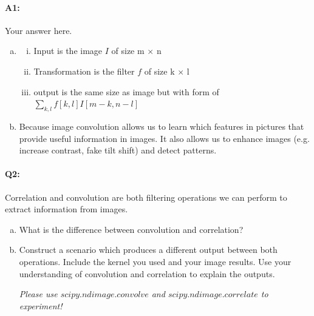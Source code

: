 \pagebreak
\paragraph{A1:} Your answer here.

\begin{enumerate}[(a)]
  \item  
\begin{enumerate}[(i)]
  \item Input is the image $I$ of size m $\times$ n 
  \item Transformation is the filter $f$ of size k $\times$ l
  \item output is the same size as image but with form of $\sum_{k,l} f[k,l]I[m-k, n-l]$
\end{enumerate}
  \item Because image convolution allows us to learn which features in pictures that provide useful information in images. It also allows us to enhance images (e.g. increase contrast, fake tilt shift) and detect patterns.
\end{enumerate}


\pagebreak
\paragraph{Q2:} Correlation and convolution are both filtering operations we can perform to extract information from images.
\begin{enumerate}[(a)]
    \item 
    What is the difference between convolution and correlation?

    \item
    Construct a scenario which produces a different output between both operations. Include the kernel you used and your image results. Use your understanding of convolution and correlation to explain the outputs.
    
    \emph{Please use \href{https://docs.scipy.org/doc/scipy/reference/generated/scipy.ndimage.convolve.html}{$scipy.ndimage.convolve$} and \href{https://docs.scipy.org/doc/scipy/reference/generated/scipy.ndimage.correlate.html}{$scipy.ndimage.correlate$} to experiment!}
    
\end{enumerate}


